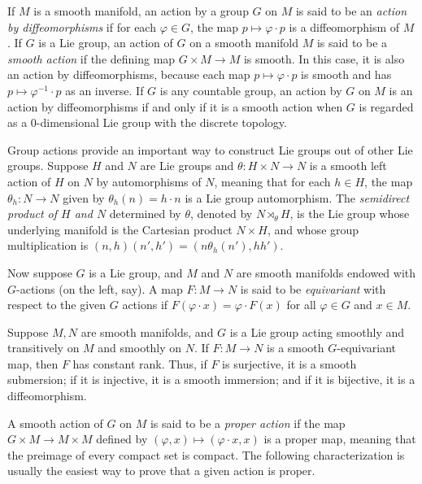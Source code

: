 If $M$ is a smooth manifold, an action by a group $G$ on $M$ is said to be an \textit{action by diffeomorphisms} if for each $\varphi \in G$, the map $p \mapsto \varphi \cdot p$ is a diffeomorphism of $M$. If $G$ is a Lie group, an action of $G$ on a smooth manifold $M$ is said to be a \textit{smooth action} if the defining map $G \times M \to M$ is smooth. In this case, it is also an action by diffeomorphisms, because each map $p \mapsto \varphi \cdot p$ is smooth and has $p \mapsto \varphi^{-1} \cdot p$ as an inverse. If $G$ is any countable group, an action by $G$ on $M$ is an action by diffeomorphisms if and only if it is a smooth action when $G$ is regarded as a $0$-dimensional Lie group with the discrete topology.

\begin{example}
\label{ex:semidirect-products}
Group actions provide an important way to construct Lie groups out of other Lie groups. Suppose $H$ and $N$ are Lie groups and $\theta : H \times N \to N$ is a smooth left action of $H$ on $N$ by automorphisms of $N$, meaning that for each $h \in H$, the map $\theta_h : N \to N$ given by $\theta_h(n) = h \cdot n$ is a Lie group automorphism. The \textit{semidirect product of $H$ and $N$} determined by $\theta$, denoted by $N \rtimes_\theta H$, is the Lie group whose underlying manifold is the Cartesian product $N \times H$, and whose group multiplication is $(n,h)(n',h') = (n\theta_h(n'),hh')$.
\end{example}

Now suppose $G$ is a Lie group, and $M$ and $N$ are smooth manifolds endowed with $G$-actions (on the left, say). A map $F : M \to N$ is said to be \textit{equivariant} with respect to the given $G$ actions if $F(\varphi \cdot x) = \varphi \cdot F(x)$ for all $\varphi \in G$ and $x \in M$.

\begin{theorem}
\label{thm:equivariant-rank-theorem}

Suppose $M, N$ are smooth manifolds, and $G$ is a Lie group acting smoothly and transitively on $M$ and smoothly on $N$. If $F : M \to N$ is a smooth $G$-equivariant map, then $F$ has constant rank. Thus, if $F$ is surjective, it is a smooth submersion; if it is injective, it is a smooth immersion; and if it is bijective, it is a diffeomorphism.
\end{theorem}

A smooth action of $G$ on $M$ is said to be a \textit{proper action} if the map $G \times M \to M \times M$ defined by $(\varphi, x) \mapsto (\varphi \cdot x, x)$ is a proper map, meaning that the preimage of every compact set is compact. The following characterization is usually the easiest way to prove that a given action is proper.

